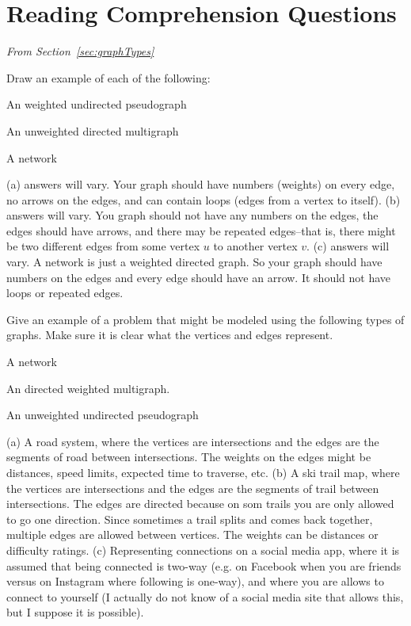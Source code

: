 \section{Reading Comprehension Questions}

\noindent
{\em From Section~\ref{sec:graphTypes}}
\begin{requ}
Draw an example of each of the following:
\begin{lenum}
\item An weighted undirected pseudograph
\item An unweighted directed multigraph
\item A network
\end{lenum}
\begin{requanswer}
(a) answers will vary. Your graph should have numbers (weights) on every edge, 
no arrows on the edges, and can contain loops (edges from a vertex to itself).
(b) answers will vary. You graph should not have any numbers on the edges,
the edges should have arrows, and there may be repeated edges--that is, there
might be two different edges from some vertex $u$ to another vertex $v$.
(c) answers will vary. A network is just a weighted directed graph. 
So your graph should have numbers on the edges and every edge should have an arrow.
It should not have loops or repeated edges.
\end{requanswer}
\end{requ}

\begin{requ}
Give an example of a problem that might be modeled using the following types of graphs.
Make sure it is clear what the vertices and edges represent.
\begin{lenum}
\item A network
\item An directed weighted multigraph. 
\item An unweighted undirected pseudograph
\end{lenum}
\begin{requanswer}
(a) A road system, where the vertices are intersections and the edges are the segments of road between intersections.
The weights on the edges might be distances, speed limits, expected time to traverse, etc.
(b) A ski trail map, where the vertices are intersections and the edges are the segments of trail between intersections.
The edges are directed because on som trails you are only allowed to go one direction.
Since sometimes a trail splits and comes back together, multiple edges are allowed between vertices.
The weights can be distances or difficulty ratings.
(c) Representing connections on a social media app, where it is assumed that being connected is two-way
(e.g. on Facebook when you are friends versus on Instagram where following is one-way), and where you are
allows to connect to yourself (I actually do not know of a social media site that allows this, but I suppose it is possible).
\end{requanswer}
\end{requ}

